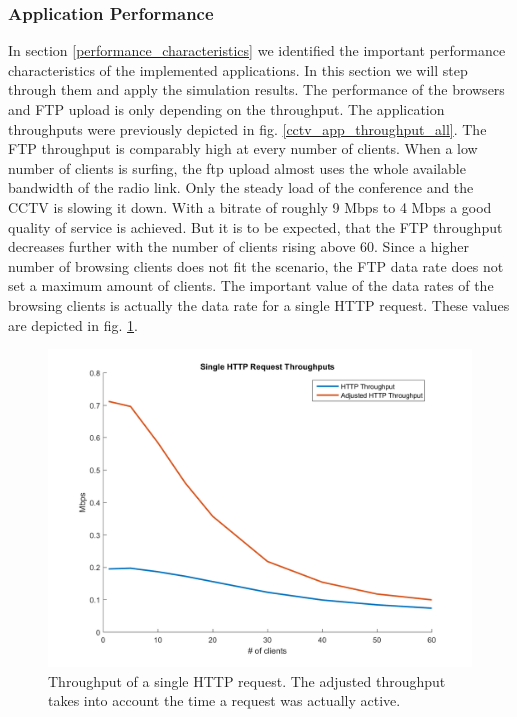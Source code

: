 \documentclass[
10pt, %
a4paper, %
oneside, %
headinclude,footinclude, %
BCOR5mm, %
]{scrartcl}
\begin{document}
\subsubsection{Application Performance}
In section \ref{performance_characteristics} we identified the important performance characteristics of the implemented applications. In this section we will step through them and apply the simulation results.
The performance of the browsers and FTP upload is only depending on the throughput. The application throughputs were previously depicted in fig. \ref{cctv_app_throughput_all}.
The FTP throughput is comparably high at every number of clients. When a low number of clients is surfing, the ftp upload almost uses the whole available bandwidth of the radio link. Only the steady load of the conference and the CCTV is slowing it down. With a bitrate of roughly 9 Mbps to 4 Mbps a good quality of service is achieved. But it is to be expected, that the FTP throughput decreases further with the number of clients rising above 60. Since a higher number of browsing clients does not fit the scenario, the FTP data rate does not set a maximum amount of clients.
The important value of the data rates of the browsing clients is actually the data rate for a single HTTP request. These values are depicted in fig. \ref{fig:cctv_http_request_throughput}.
\begin{figure}[!ht]
  \centering
  \includegraphics[width=\textwidth]{Figures/singe_http_request_throughput.png}
  \caption{Throughput of a single HTTP request. The adjusted throughput takes into account the time a request was actually active.} \label{fig:cctv_http_request_throughput}
\end{figure}
\end{document}
